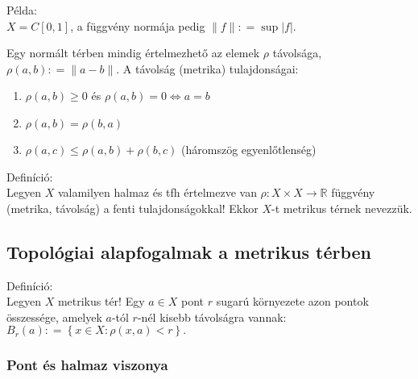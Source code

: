 \documentclass[]{scrartcl}
\providecommand{\tightlist}{%
  \setlength{\itemsep}{0pt}\setlength{\parskip}{0pt}}
\newenvironment{definicio}{}{}
\newenvironment{pelda}{}{}
\begin{document}
\begin{pelda}

Példa:\\
\(X = C\left\lbrack 0,1 \right\rbrack\), a függvény normája pedig
\(\left\| f \parallel \right.: = \sup\left| f \right|\).

\end{pelda}

Egy normált térben mindig értelmezhető az elemek \(\rho\) távolsága,
\(\rho\left( {a,b} \right): = \left\| {a - b} \parallel \right.\). A
távolság (metrika) tulajdonságai:

\begin{enumerate}
\def\labelenumi{\arabic{enumi}.}
\tightlist
\item
  \(\rho\left( {a,b} \right) \geq 0\) és
  \(\left. \rho\left( {a,b} \right) = 0\Leftrightarrow a = b \right.\)
\item
  \(\rho\left( {a,b} \right) = \rho\left( {b,a} \right)\)
\item
  \(\rho\left( {a,c} \right) \leq \rho\left( {a,b} \right) + \rho\left( {b,c} \right)\)
  (háromszög egyenlőtlenség)
\end{enumerate}

\begin{definicio}

Definíció:\\
Legyen \(X\) valamilyen halmaz és tfh értelmezve van
\(\left. \rho:X \times X\rightarrow{\mathbb{R}} \right.\) függvény
(metrika, távolság) a fenti tulajdonságokkal! Ekkor \(X\)-t metrikus
térnek nevezzük.

\end{definicio}

\subsection{Topológiai alapfogalmak a metrikus
térben}\label{topologiai-alapfogalmak-a-metrikus-terben}

\begin{definicio}

Definíció:\\
Legyen \(X\) metrikus tér! Egy \(a \in X\) pont \(r\) sugarú környezete
azon pontok összessége, amelyek \(a\)-tól \(r\)-nél kisebb távolságra
vannak:
\({B_{r}\left( a \right): = \left\{ {x \in X:\rho\left( {x,a} \right) < r} \right\}}.\)

\end{definicio}

\subsubsection{Pont és halmaz viszonya}\label{pont-es-halmaz-viszonya}
\end{document}
